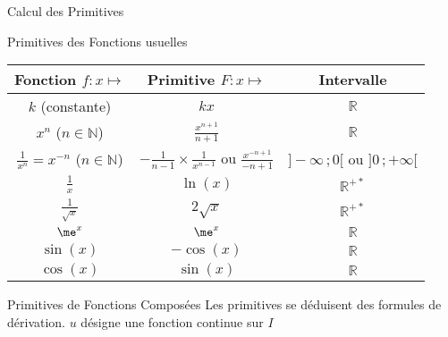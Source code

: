 \documentclass{cours}
\begin{document}
    \begin{Gpartie}{Calcul des Primitives} 
        \begin{Spartie}{Primitives des Fonctions usuelles} 
            \begin{center}\begin{tabular}[c]{ |c|c|c| } \hline
                Fonction $f:x\mapsto$                       & Primitive $F:x\mapsto$                                            & Intervalle  \\ \hline\hline
                $k$ (constante)                             & $kx$                                                              & $\mathbb{R}$ \\ \hline
                $x^n$ ($n\in\mathbb{N}$)                    & $\frac{x^{n+1}}{n+1}$                                             & $\mathbb{R}$ \\ \hline
                $\frac{1}{x^n}=x^{-n}$ ($n\in\mathbb{N}$)   & $-\frac{1}{n-1}\times\frac{1}{x^{n-1}}$ ou $\frac{x^{-n+1}}{-n+1}$& $\big]-\infty\,;0\big[$ ou $\big]0\,;+\infty\big[$ \\ \hline
                $\frac{1}{x}$                               & $\ln(x)$                                                          & $\mathbb{R^{+*}}$ \\ \hline
                $\frac{1}{\sqrt{x}}$                        & $2\sqrt{x}$                                                       & $\mathbb{R^{+*}}$ \\ \hline
                $\me^x$                                       & $\me^x$                                                             & $\mathbb{R}$ \\ \hline
                $\sin(x)$                                   & $-\cos(x)$                                                        & $\mathbb{R}$ \\ \hline
                $\cos(x)$                                   & $\sin(x)$                                                         & $\mathbb{R}$ \\ \hline
            \end{tabular}\end{center}
            \parbox{\linewidth}{}
        \end{Spartie}
        \begin{Spartie}{Primitives de Fonctions Composées}
            Les primitives se déduisent des formules de dérivation. $u$ désigne une fonction continue sur $I$ \vspace{2ex}

\end{Spartie}
\end{Gpartie}
\end{document}

